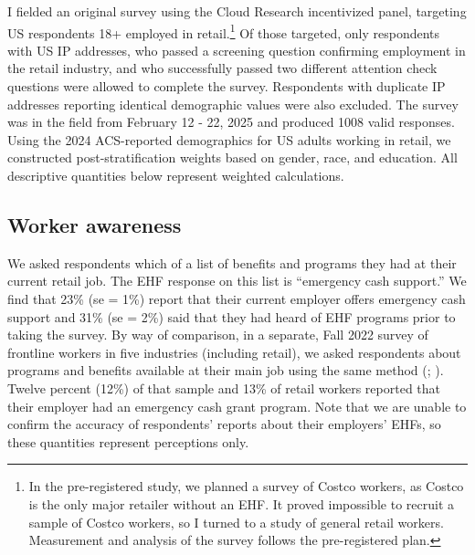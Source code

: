 \documentclass[
  11pt,
  oneside]{article}
\begin{document}
I fielded an original survey using the Cloud Research incentivized panel, targeting US respondents 18+ employed in retail.\footnote{In the pre-registered study, we planned a survey of Costco workers, as Costco is the only major retailer without an EHF. It proved impossible to recruit a sample of Costco workers, so I turned to a study of general retail workers. Measurement and analysis of the survey follows the pre-registered plan.} Of those targeted, only respondents with US IP addresses, who passed a screening question confirming employment in the retail industry, and who successfully passed two different attention check questions were allowed to complete the survey. Respondents with duplicate IP addresses reporting identical demographic values were also excluded. The survey was in the field from February 12 - 22, 2025 and produced 1008 valid responses. Using the 2024 ACS-reported demographics for US adults working in retail, we constructed post-stratification weights based on gender, race, and education. All descriptive quantities below represent weighted calculations.

\subsection{Worker awareness}\label{worker-awareness}

We asked respondents which of a list of benefits and programs they had at their current retail job. The EHF response on this list is ``emergency cash support.'' We find that 23\% (se = 1\%) report that their current employer offers emergency cash support and 31\% (se = 2\%) said that they had heard of EHF programs prior to taking the survey. By way of comparison, in a separate, Fall 2022 survey of frontline workers in five industries (including retail), we asked respondents about programs and benefits available at their main job using the same method (; ). Twelve percent (12\%) of that sample and 13\% of retail workers reported that their employer had an emergency cash grant program. Note that we are unable to confirm the accuracy of respondents' reports about their employers' EHFs, so these quantities represent perceptions only.
\end{document}
